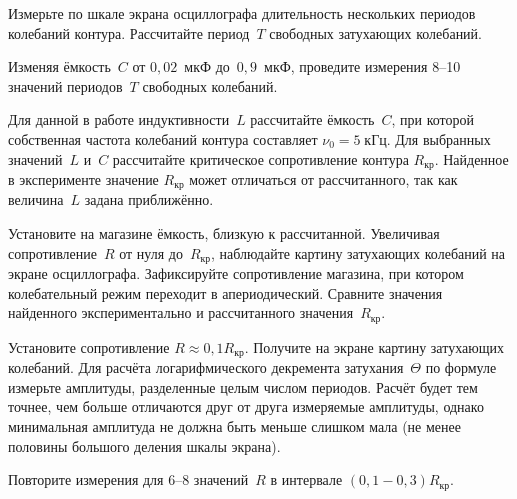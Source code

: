 \begin{lab:task}
\item Измерьте по шкале экрана осциллографа длительность нескольких периодов
колебаний контура. Рассчитайте период~$T$ свободных затухающих 
колебаний.

\item \label{325-p2} Изменяя ёмкость~$C$ от $0,02$~мкФ до~$0,9$~мкФ, проведите измерения 
8--10 значений периодов~$T$ свободных колебаний.



\item \label{325-p8} Для данной в работе индуктивности~$L$ рассчитайте ёмкость~$C$, при которой
собственная частота колебаний контура составляет $\nu_0=5\;кГц$.
Для выбранных значений~$L$ и~$C$ рассчитайте критическое сопротивление
контура $R_\text{кр}$. Найденное в эксперименте значение $R_{\text{кр}}$
может отличаться от рассчитанного, так как величина~$L$ задана приближённо.


\item Установите на магазине ёмкость, близкую к рассчитанной. Увеличивая
сопротивление~$R$ от нуля до~$R_\text{кр}$, наблюдайте картину затухающих
колебаний на экране осциллографа. Зафиксируйте сопротивление магазина, при
котором колебательный режим переходит в апериодический. Сравните значения
найденного экспериментально и рассчитанного значения~$R_\text{кр}$.

\item Установите сопротивление $R \approx 0,1 R_\text{кр}$. Получите
на экране картину затухающих колебаний. Для расчёта логарифмического декремента
затухания~$\Theta$ по формуле~ измерьте амплитуды,
разделенные целым числом периодов. Расчёт будет тем точнее, чем больше
отличаются друг от друга измеряемые амплитуды, однако минимальная амплитуда не должна быть
меньше слишком мала (не менее половины большого деления шкалы экрана).

\item \label{325-p9} Повторите измерения для 6--8 значений~$R$ 
в интервале $(0,1-0,3)R_\text{кр}$.



\end{lab:task}
